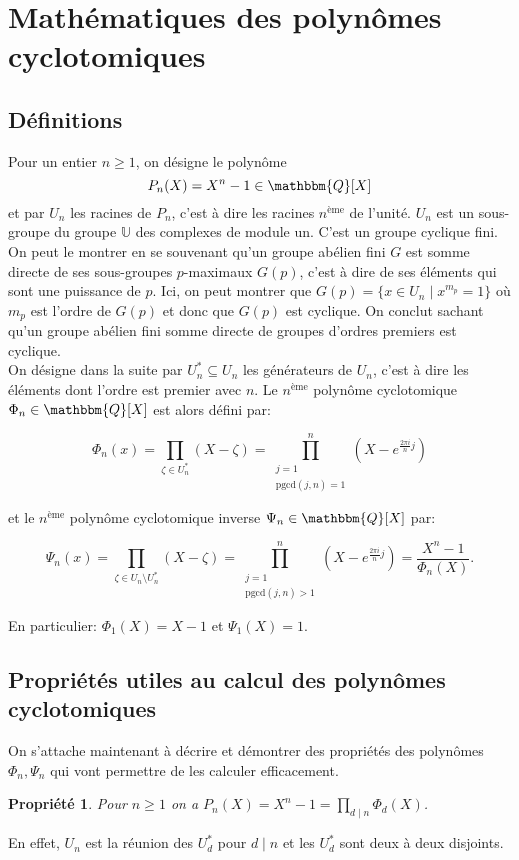 \documentclass{article}
\newcommand{\Q}{\mathbbm{Q}}
\newcommand{\pgcd}{\mathrm{pgcd}}
\theoremstyle{break}                  %
\newtheorem{propriete}{Propriété}
\begin{document}
\section*{Mathématiques des polynômes cyclotomiques}
\subsection*{Définitions}
Pour un entier $n \ge 1$, on désigne le polynôme $$P_n(X) = X^n - 1 \in \Q[X]$$ et par $U_n$ les racines de $P_n$, c'est à dire les racines $n^{\text{ème}}$ de l'unité. $U_n$ est un sous-groupe du groupe $\mathbb U$ des complexes de module un. C'est un groupe cyclique fini. On peut le montrer en se souvenant qu'un groupe abélien fini $G$ est somme directe de ses sous-groupes $p$-maximaux $G(p)$, c'est à dire de ses éléments qui sont une puissance de $p$. Ici, on peut montrer que $G(p) = \{x \in U_n \mid x^{m_p} = 1\}$ où $m_p$ est l'ordre de $G(p)$ et donc que $G(p)$ est cyclique. On conclut sachant qu'un groupe abélien fini somme directe de groupes d'ordres premiers est cyclique.\\


On désigne dans la suite par $U_n^* \subseteq U_n$ les générateurs de $U_n$, c'est à dire les éléments dont l'ordre est premier avec $n$. Le $n^{\text{ème}}$ polynôme cyclotomique $\Phi_n \in \Q[X]$ est alors défini par:

$$\Phi_n(x) = \prod_{\zeta \in U^*_n} (X - \zeta) = \prod_{\substack{j=1\\ \pgcd(j,n)=1}}^n (X - e^{\frac{2 \pi i}{n}j})$$

et le $n^{\text{ème}}$ polynôme cyclotomique inverse $\Psi_n \in \Q[X]$ par:

$$\Psi_n(x) = \prod_{\zeta \in U_n \setminus U^*_n} (X - \zeta) = \prod_{\substack{j=1\\ \pgcd(j,n) > 1}}^n (X - e^{\frac{2 \pi i}{n}j}) = \frac{X^n - 1}{\Phi_n(X)}.$$

En particulier: $\Phi_1(X) = X-1$ et $\Psi_1(X) = 1$.

\subsection*{Propriétés utiles au calcul des polynômes cyclotomiques}
On s'attache maintenant à décrire et démontrer des propriétés des polynômes $\Phi_n, \Psi_n$ qui vont permettre de les calculer efficacement. 

\begin{propriete}
	Pour $n \ge 1$ on a $P_n(X) = X^n-1 = \prod_{ d \mid n} \Phi_d(X)$.
\end{propriete}
En effet, $U_n$ est la réunion des $U_d^*$ pour $d \mid n$ et les $U_d^*$ sont deux à deux disjoints.
\end{document}

